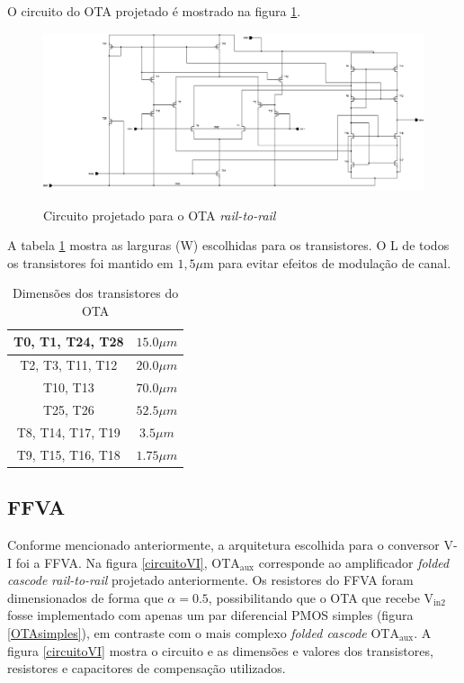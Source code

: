 \documentclass[
	12pt,				%
	oneside,			%
	a4paper,			%
	english,			%
	french,				%
	spanish,			%
	brazil				%
	]{abntex2}
\begin{document}
O circuito do OTA projetado é mostrado na figura \ref{circuitoOTA}.

\begin{figure}[!ht]
  \centering
  \includegraphics[width=450pt]{circuitoOTA.png}\\
  \caption{Circuito projetado para o OTA \textit{rail-to-rail}}\label{circuitoOTA}
\end{figure}

A tabela \ref{transOTA} mostra as larguras (W) escolhidas para os transistores. O L de todos os transistores foi mantido em $1,5\mu$m para evitar efeitos de modulação de canal.

\begin{table}[h]
    \begin{center}    
    \begin{tabular}{ | c | c | }
    \hline
    T0, T1, T24, T28  & \(15.0 \mu m\) \\ 
    \hline
    T2, T3, T11, T12  & \(20.0 \mu m\) \\ 
    \hline
    T10, T13  & \(70.0 \mu m\) \\ 
    \hline
    T25, T26 & \(52.5 \mu m\) \\ 
    \hline
    T8, T14, T17, T19  & \(3.5 \mu m\) \\ 
    \hline
    T9, T15, T16, T18  & \(1.75 \mu m\) \\ 
    \hline
    \end{tabular}
    \caption[Dimensões dos transistores do OTA]{Dimensões dos transistores do OTA}
    \label{transOTA}
    \end{center}
\end{table}

\subsection{FFVA}

Conforme mencionado anteriormente, a arquitetura escolhida para o conversor V-I foi a FFVA. Na figura \ref{circuitoVI}, \(\mathrm{OTA_{aux}}\) corresponde ao amplificador \textit{folded cascode} \textit{rail-to-rail} projetado anteriormente. Os resistores do FFVA foram dimensionados de forma que $\alpha = 0.5$, possibilitando que o OTA que recebe $\mathrm{V_{in2}}$ fosse implementado com apenas um par diferencial PMOS simples (figura \ref{OTAsimples}), em contraste com o mais complexo \textit{folded cascode} $\mathrm{OTA_{aux}}$. 
A figura \ref{circuitoVI} mostra o circuito e as dimensões e valores dos transistores, resistores e capacitores de compensação utilizados. 
\end{document}
